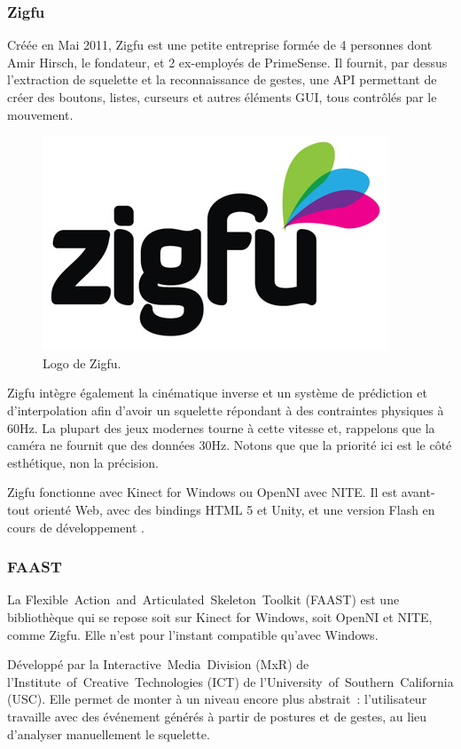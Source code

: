 \subsubsection{Zigfu}
Créée en Mai 2011, Zigfu est une petite entreprise formée de 4 personnes dont 
Amir Hirsch, le fondateur, et 2 ex-employés de PrimeSense. Il fournit, 
par dessus l'extraction de squelette et la reconnaissance
de gestes, une API permettant de créer des boutons, listes, curseurs et autres
éléments GUI, tous contrôlés par le mouvement.
\begin{figure}[h!]
\centering
\includegraphics[width=0.3\linewidth]{images/zigfu_logo}
\caption{Logo de Zigfu.}
\end{figure}
Zigfu intègre également la cinématique inverse et un système de 
prédiction et
d'interpolation afin d'avoir un squelette répondant à des contraintes 
physiques à 60Hz\cite{zigfu_video}. La plupart des jeux modernes tourne à cette 
vitesse et, 
rappelons que la caméra ne fournit que des données 30Hz. Notons que
que la priorité ici est le côté esthétique,
non la précision.

Zigfu fonctionne avec Kinect for Windows ou OpenNI avec NITE. Il est 
avant-tout orienté Web, avec des
bindings HTML 5 et Unity, et une version Flash en cours de développement
\cite{zigfu_review}.

\subsubsection{FAAST}
La Flexible~Action~and~Articulated~Skeleton~Toolkit (FAAST) est une 
bibliothèque qui se repose soit sur Kinect for Windows, soit OpenNI et NITE, 
comme Zigfu. Elle n'est pour l'instant compatible qu'avec Windows.

Développé par la Interactive~Media~Division (MxR) de 
l'Institute~of~Creative~Technologies (ICT) de 
l'University~of~Southern~California (USC). Elle permet de monter à un niveau 
encore plus abstrait~: l'utilisateur travaille avec des événement générés à
partir de postures et de gestes, au lieu d'analyser manuellement le 
squelette.


